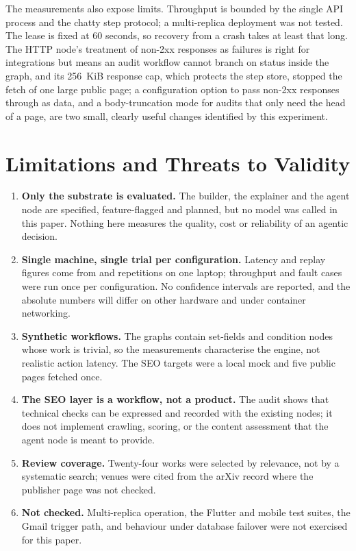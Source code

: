 \documentclass[conference]{IEEEtran}
\begin{document}
The measurements also expose limits. Throughput is bounded by the single API process and the chatty step protocol; a multi-replica deployment was not tested. The lease is fixed at 60 seconds, so recovery from a crash takes at least that long. The HTTP node's treatment of non-2xx responses as failures is right for integrations but means an audit workflow cannot branch on status inside the graph, and its 256~KiB response cap, which protects the step store, stopped the fetch of one large public page; a configuration option to pass non-2xx responses through as data, and a body-truncation mode for audits that only need the head of a page, are two small, clearly useful changes identified by this experiment.
\section{Limitations and Threats to Validity}
\begin{enumerate}
\item \textbf{Only the substrate is evaluated.} The builder, the explainer and the agent node are specified, feature-flagged and planned, but no model was called in this paper. Nothing here measures the quality, cost or reliability of an agentic decision.
\item \textbf{Single machine, single trial per configuration.} Latency and replay figures come from \LATn{} and \REPreps{} repetitions on one laptop; throughput and fault cases were run once per configuration. No confidence intervals are reported, and the absolute numbers will differ on other hardware and under container networking.
\item \textbf{Synthetic workflows.} The graphs contain set-fields and condition nodes whose work is trivial, so the measurements characterise the engine, not realistic action latency. The SEO targets were a local mock and five public pages fetched once.
\item \textbf{The SEO layer is a workflow, not a product.} The audit shows that technical checks can be expressed and recorded with the existing nodes; it does not implement crawling, scoring, or the content assessment that the agent node is meant to provide.
\item \textbf{Review coverage.} Twenty-four works were selected by relevance, not by a systematic search; venues were cited from the arXiv record where the publisher page was not checked.
\item \textbf{Not checked.} Multi-replica operation, the Flutter and mobile test suites, the Gmail trigger path, and behaviour under database failover were not exercised for this paper.
\end{enumerate}
\end{document}

